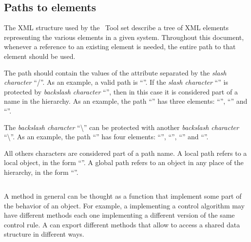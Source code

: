 \subsection{Paths to elements}
\label{sub:Paths-to-elements}

The XML structure used by the \rtd\ Tool set describe a tree of XML
elements representing the various elements in a given system.
Throughout this document, whenever a reference to an existing element
is needed, the entire path to that element should be used.

The path should contain the values of the  attribute
separated by the \emph{slash} \emph{character} {}``/''. As an example,
a valid path is {}``''. If the
\emph{slash character} {}``\const{/}'' is protected by \emph{backslash
  character} {}``\const{\\}'', then in this case it is
considered part of a name in the hierarchy. As an example, the path
{}``'' has three
elements: {}``'', {}``'' and
{}``''.

The \emph{backslash character} {}``\textbackslash{}'' can be protected
with another \emph{backslash character} {}``\textbackslash{}''.  As an
example, the path
{}``''
has four elements: {}``'',
{}``'', {}``'' and {}``''.

All others characters are considered part of a path name. A local path
refers to a local object, in the form
{}``''.  A global path refers to an
object in any place of the hierarchy, in the form
{}``''.



\subsection{}
\label{sub:METHOD}

A method in general can be thought as a function that implement some
part of the behavior of an object. For example, a 
implementing a control algorithm may have different methods each one
implementing a different version of the same control rule. A
 can export different methods that allow to access a shared
data structure in different ways.

